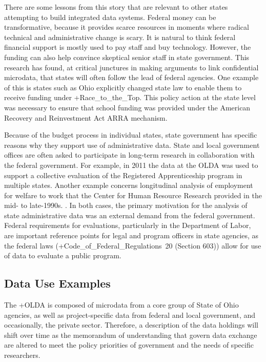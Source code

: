 \documentclass[
]{book}
\begin{document}
There are some lessons from this story that are relevant to other states attempting to build integrated data systems. Federal money can be transformative, because it provides scarce resources in moments where radical technical and administrative change is scary. It is natural to think federal financial support is mostly used to pay staff and buy technology. However, the funding can also help convince skeptical senior staff in state government. This research has found, at critical junctures in making arguments to link confidential microdata, that states will often follow the lead of federal agencies. One example of this is states such as Ohio explicitly changed state law to enable them to receive funding under +Race\_to\_the\_Top\textbar. This policy action at the state level was necessary to ensure that school funding was provided under the American Recovery and Reinvestment Act ARRA mechanism.

Because of the budget process in individual states, state government has specific reasons why they support use of administrative data. State and local government offices are often asked to participate in long-term research in collaboration with the federal government. For example, in 2011 the data at the OLDA was used to support a collective evaluation of the Registered Apprenticeship program in multiple states. Another example concerns longitudinal analysis of employment for welfare to work that the Center for Human Resource Research provided in the mid- to late-1990s. \citep{centerforhumanresourceresearch2001, reed2012}. In both cases, the primary motivation for the analysis of state administrative data was an external demand from the federal government. Federal requirements for evaluations, particularly in the Department of Labor, are important reference points for legal and program officers in state agencies, as the federal laws (+Code\_of\_Federal\_Regulations\textbar~20 (Section 603)) allow for use of data to evaluate a public program.

\hypertarget{data-use-examples-1}{%
\subsection{Data Use Examples}\label{data-use-examples-1}}

The +OLDA\textbar{} is composed of microdata from a core group of State of Ohio agencies, as well as project-specific data from federal and local government, and occasionally, the private sector. Therefore, a description of the data holdings will shift over time as the memorandum of understanding that govern data exchange are altered to meet the policy priorities of government and the needs of specific researchers.
\end{document}
